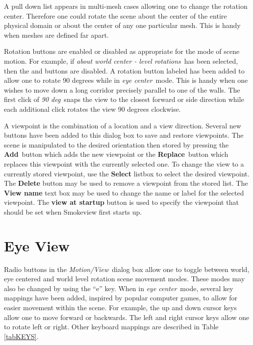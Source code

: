 \documentclass[11pt,twoside]{book}
\newcommand{\parma}{.75}
\newcommand{\parmb}{.5}
\newcommand{\parmc}{0.25}
\newcommand{\frameit}[1]{\fbox{\tt #1}}
\newcommand{\blist}{
\begin{list}
{}{
\setlength{\leftmargin}{\parma in}
\setlength{\labelwidth}{\parmb in}
\setlength{\labelsep}{\parmc in}
\setlength{\listparindent}{0.3in}
\setlength{\topsep}{.3in}
\setlength{\parsep}{.0in}
}}
\newcommand{\elist}{\end{list}}
\newcommand{\hitem}[1]{\item[{\bf #1} \hfill]}
\begin{document}
\blist

\hitem{Rotate about}A pull down list appears in
multi-mesh cases allowing one to change the rotation center.
Therefore one could rotate the scene about the center of the
entire physical domain or about the center of any one particular
mesh. This is handy when meshes are defined far apart.

\hitem{Rotation Buttons}Rotation buttons are enabled or disabled
as appropriate for the mode of scene motion. For example, if
{\em about world center - level rotations}\ has been selected, then
the \frameit{Rotate X} and \frameit{Rotate eye} buttons are
disabled.  A rotation button labeled \frameit{90 deg} has been
added to allow one to rotate 90 degrees while in {\em eye center}\
mode. This is handy when one wishes to move down a long corridor
precisely parallel to one of the walls.  The first click of {\em 90
deg}\ snaps the view to the closest forward or side direction
while each additional click rotates the view 90 degrees clockwise.

\hitem{View Buttons}A viewpoint is the combination of a
location and a view direction.  Several new buttons have been
added to this dialog box to save and restore viewpoints.  The
scene is manipulated to the desired orientation then stored by pressing the
{\bf Add}\ button which adds the new viewpoint or the {\bf Replace}\
button which replaces this viewpoint with the currently selected one.
To change the view to a currently stored viewpoint, use the {\bf
Select} listbox to select the desired viewpoint. The {\bf Delete} button may be used to
remove a viewpoint from the stored list.  The {\bf View name} text box
may be used to change the name or label for the selected
viewpoint.  The {\bf view at startup} button is used to specify
the viewpoint that should be set when Smokeview first starts up.

\elist

\section{Eye View}

Radio buttons in the {\em Motion/View}\ dialog box allow one to toggle
between world, eye centered and world level rotation scene
movement modes. These modes may also be changed by using the ``e''
key. When in {\em eye center}\ mode, several key mappings have been
added, inspired by popular computer games, to allow for easier
movement within the scene. For example, the up and down cursor
keys allow one to move forward or backwards.  The left and right
cursor keys allow one to rotate left or right. Other keyboard
mappings are described in Table \ref{tabKEYS}.
\end{document}
